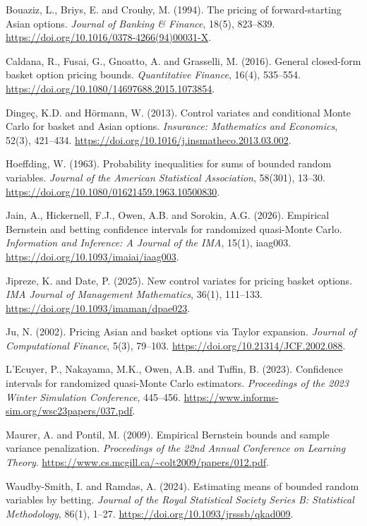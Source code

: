 Bouaziz, L., Briys, E. and Crouhy, M. (1994).
The pricing of forward-starting Asian options.
\emph{Journal of Banking \& Finance}, 18(5), 823--839.
\url{https://doi.org/10.1016/0378-4266(94)00031-X}.

Caldana, R., Fusai, G., Gnoatto, A. and Grasselli, M. (2016).
General closed-form basket option pricing bounds.
\emph{Quantitative Finance}, 16(4), 535--554.
\url{https://doi.org/10.1080/14697688.2015.1073854}.

Dinge\c{c}, K.D. and H\"ormann, W. (2013).
Control variates and conditional Monte Carlo for basket and Asian options.
\emph{Insurance: Mathematics and Economics}, 52(3), 421--434.
\url{https://doi.org/10.1016/j.insmatheco.2013.03.002}.

Hoeffding, W. (1963).
Probability inequalities for sums of bounded random variables.
\emph{Journal of the American Statistical Association}, 58(301), 13--30.
\url{https://doi.org/10.1080/01621459.1963.10500830}.

Jain, A., Hickernell, F.J., Owen, A.B. and Sorokin, A.G. (2026).
Empirical Bernstein and betting confidence intervals for randomized quasi-Monte Carlo.
\emph{Information and Inference: A Journal of the IMA}, 15(1), iaag003.
\url{https://doi.org/10.1093/imaiai/iaag003}.

Jipreze, K. and Date, P. (2025).
New control variates for pricing basket options.
\emph{IMA Journal of Management Mathematics}, 36(1), 111--133.
\url{https://doi.org/10.1093/imaman/dpae023}.

Ju, N. (2002).
Pricing Asian and basket options via Taylor expansion.
\emph{Journal of Computational Finance}, 5(3), 79--103.
\url{https://doi.org/10.21314/JCF.2002.088}.

L'Ecuyer, P., Nakayama, M.K., Owen, A.B. and Tuffin, B. (2023).
Confidence intervals for randomized quasi-Monte Carlo estimators.
\emph{Proceedings of the 2023 Winter Simulation Conference}, 445--456.
\url{https://www.informs-sim.org/wsc23papers/037.pdf}.

Maurer, A. and Pontil, M. (2009).
Empirical Bernstein bounds and sample variance penalization.
\emph{Proceedings of the 22nd Annual Conference on Learning Theory}.
\url{https://www.cs.mcgill.ca/~colt2009/papers/012.pdf}.

Waudby-Smith, I. and Ramdas, A. (2024).
Estimating means of bounded random variables by betting.
\emph{Journal of the Royal Statistical Society Series B: Statistical Methodology},
86(1), 1--27.
\url{https://doi.org/10.1093/jrsssb/qkad009}.

